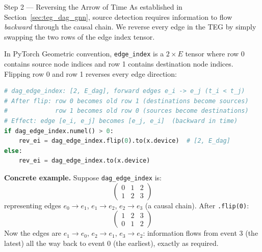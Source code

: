\begin{codewalk}{Step 2 --- Reversing the Arrow of Time}
As established in Section~\ref{sec:teg_dag_gnn}, source detection requires
information to flow \emph{backward} through the causal chain. We reverse every
edge in the TEG by simply swapping the two rows of the edge index tensor.

In PyTorch Geometric convention, \texttt{edge\_index} is a $2 \times E$ tensor
where row 0 contains source node indices and row 1 contains destination node
indices. Flipping row 0 and row 1 reverses every edge direction:

\begin{lstlisting}[language=Python]
# dag_edge_index: [2, E_dag], forward edges e_i -> e_j (t_i < t_j)
# After flip: row 0 becomes old row 1 (destinations become sources)
#             row 1 becomes old row 0 (sources become destinations)
# Effect: edge [e_i, e_j] becomes [e_j, e_i]  (backward in time)
if dag_edge_index.numel() > 0:
    rev_ei = dag_edge_index.flip(0).to(x.device)  # [2, E_dag]
else:
    rev_ei = dag_edge_index.to(x.device)
\end{lstlisting}

\textbf{Concrete example.}
Suppose \texttt{dag\_edge\_index} is:
\[
\begin{pmatrix} 0 & 1 & 2 \\ 1 & 2 & 3 \end{pmatrix}
\]
representing edges $e_0 \to e_1$, $e_1 \to e_2$, $e_2 \to e_3$ (a causal chain).
After \texttt{.flip(0)}:
\[
\begin{pmatrix} 1 & 2 & 3 \\ 0 & 1 & 2 \end{pmatrix}
\]
Now the edges are $e_1 \to e_0$, $e_2 \to e_1$, $e_3 \to e_2$: information
flows from event 3 (the latest) all the way back to event 0 (the earliest),
exactly as required.
\end{codewalk}

